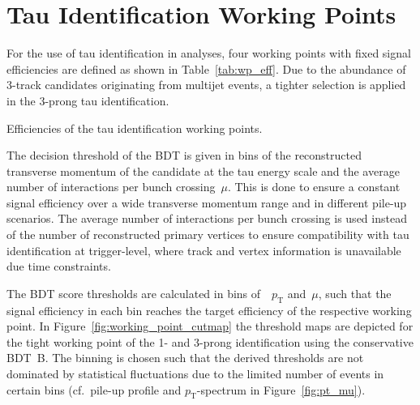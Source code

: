 \section{Tau Identification Working Points}
\label{sec:bdt_working_points}

For the use of tau identification in analyses, four working points with fixed
signal efficiencies are defined as shown in Table~\ref{tab:wp_eff}. Due to the
abundance of 3-track \tauhadvis candidates originating from multijet events, a
tighter selection is applied in the 3-prong tau identification. 

\begin{table}[htb]
  \centering
  {\small}
  \caption{Efficiencies of the tau identification working points.}
  \label{tab:wp_eff}
\end{table}

The decision threshold of the BDT is given in bins of the reconstructed
transverse momentum of the \tauhadvis candidate at the tau energy scale and the
average number of interactions per bunch crossing~$\mu$. This is done to ensure
a constant signal efficiency over a wide transverse momentum range and in
different pile-up scenarios. The average number of interactions per bunch
crossing is used instead of the number of reconstructed primary vertices to
ensure compatibility with tau identification at trigger-level, where track and
vertex information is unavailable due time constraints.

The BDT score thresholds are calculated in bins of~\tauhadvis~$p_\text{T}$
and~$\mu$, such that the signal efficiency in each bin reaches the target
efficiency of the respective working point. In
Figure~\ref{fig:working_point_cutmap} the threshold maps are depicted for the
tight working point of the 1- and 3-prong identification using the conservative
\mbox{BDT B}. The binning is chosen such that the derived thresholds are not
dominated by statistical fluctuations due to the limited number of events in
certain bins (cf.\ pile-up profile and \tauhadvis $p_\text{T}$-spectrum in
Figure~\ref{fig:pt_mu}).

